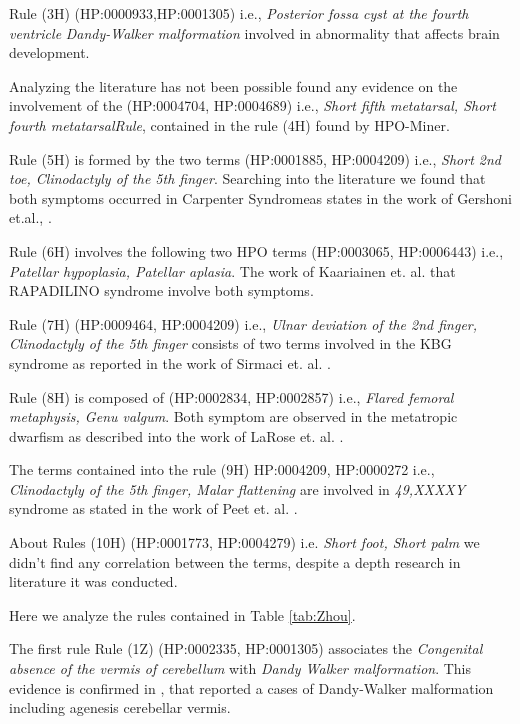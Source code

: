 \documentclass{article}
\theoremstyle{definition}
\begin{document}
Rule (3H) (HP:0000933,HP:0001305) i.e., \textit{Posterior fossa cyst at the fourth ventricle} \textit{Dandy-Walker malformation} involved in abnormality that affects brain development.

Analyzing the literature has not been possible found any evidence on the involvement of the (HP:0004704, HP:0004689)	i.e., \textit{Short fifth metatarsal, Short fourth metatarsalRule}, contained in the rule (4H) found by HPO-Miner.


Rule (5H) is formed by the two terms (HP:0001885, HP:0004209)	i.e., \textit{Short 2nd toe, Clinodactyly of the 5th finger}. Searching into the literature we found that both symptoms occurred in  Carpenter Syndromeas states in the work of Gershoni et.al., \cite{gershoni1990carpenter}.

Rule (6H) involves the following two HPO terms (HP:0003065, HP:0006443) 	i.e., \textit{Patellar hypoplasia,  Patellar aplasia}. The work of Kaariainen et. al. \cite{kaariainen1989rapadilino} that RAPADILINO syndrome involve both symptoms.

Rule (7H) (HP:0009464, HP:0004209) i.e., \textit{Ulnar deviation of the 2nd finger, Clinodactyly of the 5th finger} consists of two terms involved in the KBG syndrome as reported in the work of Sirmaci et. al. \cite{sirmaci2011mutations}.

Rule (8H) is composed of (HP:0002834, HP:0002857)	i.e., \textit{Flared femoral metaphysis, Genu valgum}. Both symptom are observed in the metatropic dwarfism as described into the work of LaRose et. al. \cite{larose1969metatropic}.

The terms contained into the rule (9H) HP:0004209, HP:0000272 i.e.,	\textit{Clinodactyly of the 5th finger, Malar flattening} are involved in \textit{49,XXXXY} syndrome as stated in the work of Peet et. al. \cite{peet199849}.

About Rules (10H) (HP:0001773, HP:0004279) i.e. \textit{Short foot, Short palm} we didn't find any correlation between the terms, despite a depth research in literature it was conducted.

\pagebreak
Here we analyze the rules contained in Table \ref{tab:Zhou}.

The first rule Rule (1Z) (HP:0002335, HP:0001305) associates the \textit{Congenital absence of the vermis of cerebellum} with \textit{Dandy Walker malformation}. This evidence is confirmed in \cite{bordarier1990dandy}, that reported a cases of Dandy-Walker malformation including agenesis cerebellar vermis.
\end{document}

